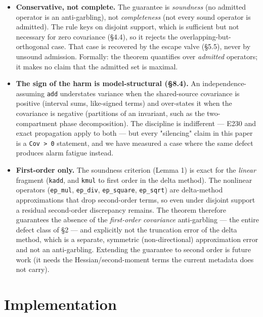\documentclass[sigplan,review,anonymous,10pt]{acmart}
\begin{document}
\begin{itemize}
  \item \textbf{Conservative, not complete.} The guarantee is \emph{soundness} (no admitted operator is an anti-garbling), not \emph{completeness} (not every sound operator is admitted). The rule keys on disjoint support, which is sufficient but not necessary for zero covariance (§4.4), so it rejects the overlapping-but-orthogonal case. That case is recovered by the escape valve (§5.5), never by unsound admission. Formally: the theorem quantifies over \emph{admitted} operators; it makes no claim that the admitted set is maximal.
\end{itemize}

\begin{itemize}
  \item \textbf{The sign of the harm is model-structural (§8.4).} An independence-assuming \texttt{add} understates variance when the shared-source covariance is positive (interval sums, like-signed terms) and over-states it when the covariance is negative (partitions of an invariant, such as the two-compartment phase decomposition). The discipline is indifferent --- E230 and exact propagation apply to both --- but every "silencing" claim in this paper is a \texttt{Cov > 0} statement, and we have measured a case where the same defect produces alarm fatigue instead.
\end{itemize}

\begin{itemize}
  \item \textbf{First-order only.} The soundness criterion (Lemma 1) is exact for the \emph{linear} fragment (\texttt{kadd}, and \texttt{kmul} to first order in the delta method). The nonlinear operators (\texttt{ep\_mul}, \texttt{ep\_div}, \texttt{ep\_square}, \texttt{ep\_sqrt}) are delta-method approximations that drop second-order terms, so even under disjoint support a residual second-order discrepancy remains. The theorem therefore guarantees the absence of the \emph{first-order covariance} anti-garbling --- the entire defect class of §2 --- and explicitly not the truncation error of the delta method, which is a separate, symmetric (non-directional) approximation error and not an anti-garbling. Extending the guarantee to second order is future work (it needs the Hessian/second-moment terms the current metadata does not carry).
\end{itemize}

\section{Implementation}
\end{document}
